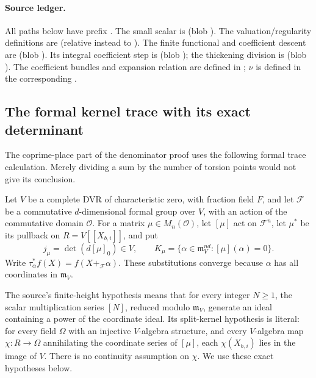 \paragraph{Source ledger.}
All paths below have prefix
.
The small scalar is
(blob ).
The valuation/regularity definitions are
 (relative instead to
).
The finite functional and coefficient descent are
(blob ).
Its integral coefficient step is
(blob );
the thickening division is
(blob ).
The coefficient bundles and expansion relation are defined in
;
\(\nu\) is defined in the corresponding
.

\subsection{The formal kernel trace with its exact determinant}
\label{subsec:ftb-formal-kernel-trace}

The coprime-place part of the denominator proof uses the following
formal trace calculation.  Merely dividing a sum by the number of
torsion points would not give its conclusion.

Let \(V\) be a complete DVR of characteristic zero, with fraction
field \(F\), and let \(\mathcal F\) be a commutative \(d\)-dimensional
formal group over \(V\), with an action of the commutative domain
\(\mathcal O\).
For a matrix \(\mu\in M_n(\mathcal O)\), let \([\mu]\) act on
\(\mathcal F^n\), let \(\mu^*\) be its pullback on
\(R=V[[X_{b,i}]]\), and put
\[
 j_\mu=\det(d[\mu]_0)\in V,\qquad
 K_\mu=\{\alpha\in\mathfrak m_V^{nd}:[\mu](\alpha)=0\}.
\]
Write \(\tau_\alpha^*f(X)=f(X+_{\mathcal F}\alpha)\).
These substitutions converge because \(\alpha\) has all coordinates
in \(\mathfrak m_V\).

The source's finite-height hypothesis means that for every integer
\(N\ge1\), the scalar multiplication series \([N]\), reduced modulo
\(\mathfrak m_V\), generate an ideal containing a power of the
coordinate ideal.
Its split-kernel hypothesis is literal: for every field \(\Omega\)
with an injective \(V\)-algebra structure, and every \(V\)-algebra map
\(\chi:R\to\Omega\) annihilating the coordinate series of \([\mu]\),
each \(\chi(X_{b,i})\) lies in the image of \(V\).
There is no continuity assumption on \(\chi\).
We use these exact hypotheses below.

